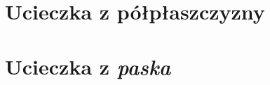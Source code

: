 \documentclass[aspectratio=169]{beamer}
\begin{document}
\section{Ucieczka z półpłaszczyzny}

\begin{frame}
  \begin{figure}
    	{\escapeFromHalfplaneTex}
  \end{figure}
\end{frame}

\begin{frame}
  \begin{figure}
    	{\escapeFromHalfplaneConvPlotTex}
  \end{figure}
\end{frame}

\section{Ucieczka z \textit{paska}}

\begin{frame}
  \begin{figure}
    	{\escapeFromStripTex}
  \end{figure}
\end{frame}

\begin{frame}
  \begin{figure}
    	{\escapeFromStripConvPlotTex}
  \end{figure}
\end{frame}
\end{document}
